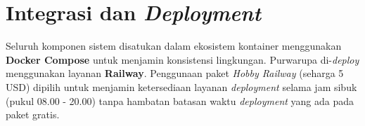 \section{Integrasi dan \textit{Deployment}}
\label{sec:integration_deployment}

Seluruh komponen sistem disatukan dalam ekosistem kontainer menggunakan \textbf{Docker Compose} untuk menjamin konsistensi lingkungan. Purwarupa di-\textit{deploy} menggunakan layanan \textbf{Railway}. Penggunaan paket \textit{Hobby Railway} (seharga 5 USD) dipilih untuk menjamin ketersediaan layanan \textit{deployment} selama jam sibuk (pukul 08.00 - 20.00) tanpa hambatan batasan waktu \textit{deployment} yang ada pada paket gratis.